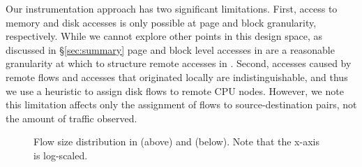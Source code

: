 
Our instrumentation approach has two significant limitations. First, access to memory and disk accesses is only possible at page and block granularity, respectively. While we cannot explore other points in this design space, as discussed in \S\ref{sec:summary} page and block level accesses in \dis are a reasonable granularity at which to structure remote accesses in \dis. Second, accesses caused by remote flows and accesses that originated locally are indistinguishable, and thus we use a heuristic to assign disk flows to remote CPU nodes. However, we note this limitation affects only the assignment of flows to source-destination pairs, not the amount of traffic observed.

%
\begin{figure}
  \centering
  \caption{\small{Flow size distribution in \dis (above) and \pdis (below). Note that the x-axis is log-scaled.}}
  \label{fig:fsd}
\end{figure}
%

